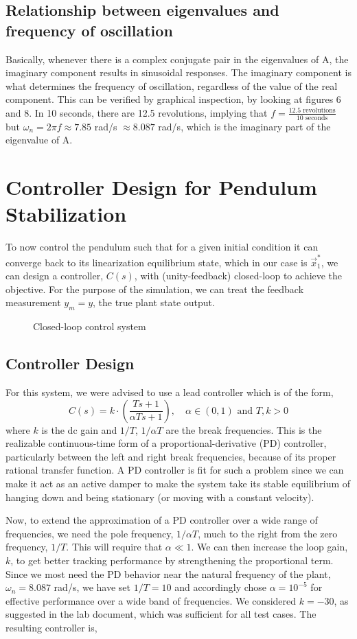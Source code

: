 \documentclass[10pt]{article}
\begin{document}
\subsection{Relationship between eigenvalues and frequency of oscillation}
Basically, whenever there is a complex conjugate pair in the eigenvalues of A, the imaginary component results in sinusoidal responses. The imaginary component is what determines the frequency of oscillation, regardless of the value of the real component. This can be verified by graphical inspection, by looking at figures 6 and 8. In 10 seconds, there are 12.5 revolutions, implying that $f = \frac{12.5 \text{ revolutions}}{10 \text{ seconds}}$ but $\omega_n = 2\pi f \approx 7.85$ rad/s $\approx 8.087$ rad/s, which is the imaginary part of the eigenvalue of A.

\section{Controller Design for Pendulum Stabilization}
To now control the pendulum such that for a given initial condition it can converge back to its linearization equilibrium state, which in our case is $\vec{x}_1^*$, we can design a controller, $C(s)$, with (unity-feedback) closed-loop to achieve the objective. For the purpose of the simulation, we can treat the feedback measurement $y_m = y$, the true plant state output.

\begin{figure}[!h]
    \centering
    \mixedcls
    \caption{Closed-loop control system}
\end{figure}

\subsection{Controller Design}
For this system, we were advised to use a lead controller which is of the form, 
\[ C(s) = k\cdot\left(\frac{Ts + 1}{\alpha Ts + 1}\right), \quad \alpha \in (0,1) \text{ and } T,k > 0\]
where $k$ is the dc gain and $1/T$, $1/\alpha T$ are the break frequencies. This is the realizable continuous-time form of a proportional-derivative (PD) controller, particularly between the left and right break frequencies, because of its proper rational transfer function. A PD controller is fit for such a problem since we can make it act as an active damper to make the system take its stable equilibrium of hanging down and being stationary (or moving with a constant velocity).

Now, to extend the approximation of a PD controller over a wide range of frequencies, we need the pole frequency, $1/\alpha T$, much to the right from the zero frequency, $1/T$. This will require that $\alpha \ll 1$. We can then increase the loop gain, $k$, to get better tracking performance by strengthening the proportional term. Since we most need the PD behavior near the natural frequency of the plant, $\omega_n = 8.087$ rad/s, we have set $1/T = 10$ and accordingly chose $\alpha=10^{-5}$ for effective performance over a wide band of frequencies. We considered $k = -30$, as suggested in the lab document, which was sufficient for all test cases. The resulting controller is,
\end{document}
